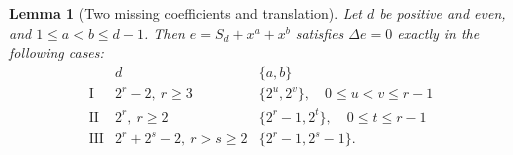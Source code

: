 \documentclass[11pt]{article}
\newtheorem{lemma}[proposition]{Lemma}
\theoremstyle{definition}
\theoremstyle{remark}
\begin{document}
\begin{lemma}[Two missing coefficients and translation]
\label{lem:two-zero-periodic}
Let $d$ be positive and even, and $1\le a<b\le d-1$. Then
$e=S_d+x^a+x^b$ satisfies $\Delta e=0$ exactly in the following cases:
\begin{equation}\label{eq:two-zero-types}
\begin{array}{c|c|c}
 &d&\{a,b\}\\ \hline
\mathrm{I}&2^r-2,\ r\ge3&\{2^u,2^v\},\quad0\le u<v\le r-1\\
\mathrm{II}&2^r,\ r\ge2&\{2^r-1,2^t\},\quad0\le t\le r-1\\
\mathrm{III}&2^r+2^s-2,\ r>s\ge2&\{2^r-1,2^s-1\}.
\end{array}
\end{equation}
\end{lemma}
\end{document}
